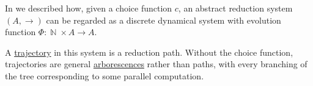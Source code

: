 \begin{example}\label{ex:abstract_reduction_trajectories}
  In  we described how, given a choice function \( c \), an abstract reduction system \( (A, \to) \) can be regarded as a discrete dynamical system with evolution function \( \Phi: \BbbN \times A \to A \).

  A \hyperref[def:dynamical_system_trajectory]{trajectory} in this system is a reduction path. Without the choice function, trajectories are general \hyperref[def:arborescence]{arborescences} rather than paths, with every branching of the tree corresponding to some parallel computation.
\end{example}
